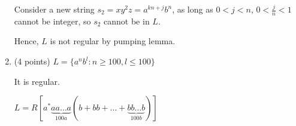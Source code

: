 \documentclass[paper=a4, fontsize=11pt]{scrartcl} %
\begin{document}
\begin{enumerate}
  Consider a new string $s_2 = xy^2z = a^{kn+j}b^n$,
  as long as $0<j<n$, $0<\frac{j}{n}<1$ cannot be integer, so $s_2$ cannot be in $L$.

  Hence, $L$ is not regular by pumping lemma.

\item
  \begin{fancyquotes}
    (4 points) $L = \{a^{n}b^l : n\geq 100, l\leq 100\}$
  \end{fancyquotes}

  It is regular.

  $L = R[a^*\underbrace{aa\ldots a}_{100 a}
  (b+bb+\ldots+\underbrace{bb\ldots b}_{100 b})]$

\end{enumerate}

\pagebreak

\section{}
\end{document}
